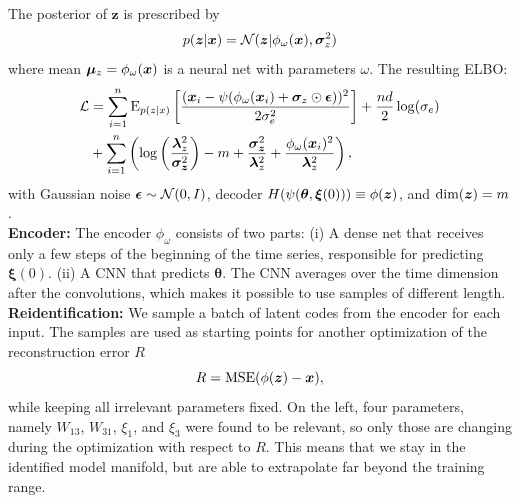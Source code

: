 \documentclass[25pt]{tikzposter}
\begin{document}
\begin{columns}
{    The posterior of $\bm z$ is prescribed by
    \begin{align}
      \label{eq:ard_posterior}
      p(\bm{z}|\bm{x}) = \mathcal{N}(\bm{z}|\phi_\omega(\bm{x}), \bm{\sigma}_z^2)
    \end{align}
    where mean $\bm{\mu}_{z}=\phi_\omega(\bm{x})$ is a neural net with parameters
    $\omega$.
    The resulting ELBO:
    {\fontsize{25}{20}
    \begin{equation}
    \begin{aligned}
      \label{eq:elbo_reparam}
      \mathcal{L} &= \sum_{i=1}^n \text{E}_{p(z|x)}\left[\frac{(\bm{x}_i - \psi(\phi_\omega(\bm{x}_i) + \bm{\sigma}_z \odot \bm{\epsilon}))^2}{2\sigma_e^2}\right]
                  + \frac{nd}{2}\log(\sigma_e) \\
                  &+ \sum_{i=1}^n \left(
                      \log\left(\frac{\bm{\lambda}_z^2}{\bm{\sigma_z}^2}\right)
                      -m + \frac{\bm{\sigma_z}^2}{\bm{\lambda}_z^2} + \frac{\phi_\omega(\bm{x}_i)^2}{\bm{\lambda}_z^2}
                  \right),
    \end{aligned}
    \end{equation}}
    with Gaussian noise $\bm{\epsilon} \sim \mathcal{N}(0,I)$, decoder
    $H(\psi(\bm\theta,\bm\xi(0)))\equiv\phi(\bm{z})$, and $\text{dim}(\bm{z}) = m$.\\

    \textbf{Encoder:} The encoder $\phi_\omega$ consists of two parts: (i) A
    dense net that receives only a few steps of the beginning of the time
    series, responsible for predicting $\bm \xi(0)$. (ii) A CNN that predicts
    $\bm \theta$.  The CNN averages over the time dimension after the
    convolutions, which makes it possible to use samples of different length.\\

    \textbf{Reidentification:} We sample a batch of
    latent codes from the encoder for each input.  The samples
    are used as starting points for another optimization of the reconstruction
    error $R$
    \begin{equation}
      R = \mathrm{MSE}(\phi(\bm z) - \bm{x}),
    \end{equation}
    while keeping all irrelevant parameters fixed.
    On the left, four parameters, namely $W_{13}$,
    $W_{31}$, $\xi_{1}$, and $\xi_{3}$ were found to be relevant, so only
    those are changing during the optimization with respect to $R$.
    This means that we stay in the identified model manifold, but are able to
    extrapolate far beyond the training range.   

    \vspace{1.35cm}
  }
  
\end{columns}
\end{document}

